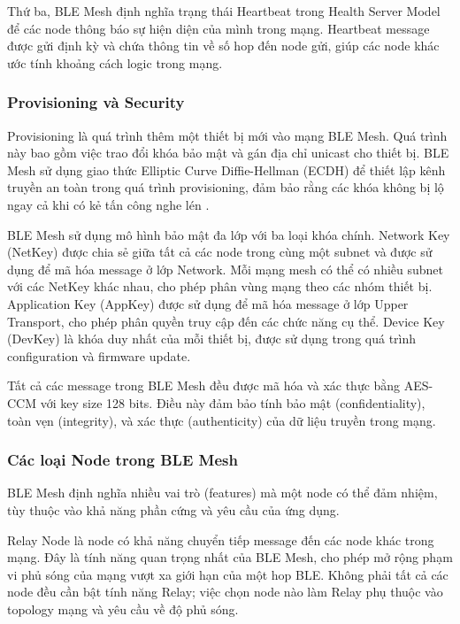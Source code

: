 Thứ ba, BLE Mesh định nghĩa trạng thái Heartbeat trong Health Server Model để các node thông báo sự hiện diện của mình trong mạng. Heartbeat message được gửi định kỳ và chứa thông tin về số hop đến node gửi, giúp các node khác ước tính khoảng cách logic trong mạng.

\subsubsection{Provisioning và Security}

Provisioning là quá trình thêm một thiết bị mới vào mạng BLE Mesh. Quá trình này bao gồm việc trao đổi khóa bảo mật và gán địa chỉ unicast cho thiết bị. BLE Mesh sử dụng giao thức Elliptic Curve Diffie-Hellman (ECDH) để thiết lập kênh truyền an toàn trong quá trình provisioning, đảm bảo rằng các khóa không bị lộ ngay cả khi có kẻ tấn công nghe lén \cite{bluetooth_mesh_profile}.

BLE Mesh sử dụng mô hình bảo mật đa lớp với ba loại khóa chính. Network Key (NetKey) được chia sẻ giữa tất cả các node trong cùng một subnet và được sử dụng để mã hóa message ở lớp Network. Mỗi mạng mesh có thể có nhiều subnet với các NetKey khác nhau, cho phép phân vùng mạng theo các nhóm thiết bị. Application Key (AppKey) được sử dụng để mã hóa message ở lớp Upper Transport, cho phép phân quyền truy cập đến các chức năng cụ thể. Device Key (DevKey) là khóa duy nhất của mỗi thiết bị, được sử dụng trong quá trình configuration và firmware update.

Tất cả các message trong BLE Mesh đều được mã hóa và xác thực bằng AES-CCM với key size 128 bits. Điều này đảm bảo tính bảo mật (confidentiality), toàn vẹn (integrity), và xác thực (authenticity) của dữ liệu truyền trong mạng.

\subsubsection{Các loại Node trong BLE Mesh}

BLE Mesh định nghĩa nhiều vai trò (features) mà một node có thể đảm nhiệm, tùy thuộc vào khả năng phần cứng và yêu cầu của ứng dụng.

Relay Node là node có khả năng chuyển tiếp message đến các node khác trong mạng. Đây là tính năng quan trọng nhất của BLE Mesh, cho phép mở rộng phạm vi phủ sóng của mạng vượt xa giới hạn của một hop BLE. Không phải tất cả các node đều cần bật tính năng Relay; việc chọn node nào làm Relay phụ thuộc vào topology mạng và yêu cầu về độ phủ sóng.

